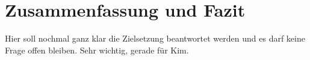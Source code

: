\chapter{Zusammenfassung und Fazit} \label{ch_Fazit}
Hier soll nochmal ganz klar die Zielsetzung beantwortet werden und es darf keine Frage offen bleiben.
Sehr wichtig, gerade für Kim.
